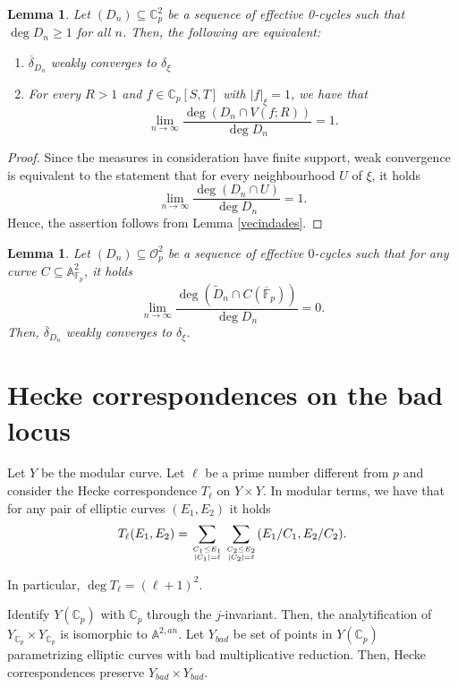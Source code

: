 \documentclass[a4paper,11pt]{amsart}
\newcommand{\Fp}{\mathbb{F}_p}
\newcommand{\Fpbar}{\overline{\mathbb{F}}_p}
\newcommand{\ce}{\mathbb{C}}
\newcommand{\Aan}{\mathbb{A}^{2,an}}
\newcommand{\Oo}{\mathcal{O}}
\newtheorem{lema}[thm]{Lemma}
\theoremstyle{definition}
\begin{document}
\begin{lema}\label{criterion}
Let $(D_n)\subseteq \ce_p^2$ be a sequence of effective 0-cycles such that $\deg D_n\geq 1$ for all $n$. Then, the following are equivalent:
\begin{enumerate}
\item[i)] $\overline{\delta}_{D_n} $ weakly converges to $\delta_\xi$
\item[ii)] For every $R>1$ and $f\in \ce_p[S,T]$ with $|f|_\xi=1$, we have that $$\lim_{n\rightarrow \infty} \frac{\deg \left(D_n\cap V(f;R)\right)}{\deg D_n} =1.$$ 
\end{enumerate}
\end{lema}

\begin{proof}
Since the measures in consideration have finite support, weak convergence is equivalent to the statement that for every neighbourhood $U$ of $\xi$, it holds $$\lim_{n\rightarrow \infty} \frac{\deg (D_n\cap U)}{\deg D_n} =1.$$ Hence, the assertion follows from Lemma \ref{vecindades}.
\end{proof}

\begin{lema}\label{criterionmodp}
Let $(D_n)\subseteq \Oo_p^2$ be a sequence of effective $0$-cycles such that for any curve $C\subseteq \mathbb{A}^2_{\Fp}$, it holds $$\lim_{n\rightarrow \infty} \frac{\deg\left(\tilde{D}_n\cap C(\Fpbar)\right)}{\deg D_n} =0.$$ Then, $\overline{\delta}_{D_n}$ weakly converges to $\delta_\xi$.
\end{lema}

\section{Hecke correspondences on the bad locus}
Let $Y$ be the modular curve. Let $\ell$ be a prime number different from $p$ and consider the Hecke correspondence $T_\ell$ on $Y\times Y$. In modular terms, we have that for any pair of elliptic curves $(E_1,E_2)$ it holds $$T_\ell(E_1,E_2)=\sum_{C_1\leq E_1 \atop |C_1|=\ell } \sum_{C_2\leq E_2 \atop |C_2|=\ell } (E_1/C_1,E_2/C_2).$$

In particular, $\deg T_\ell = (\ell+1)^2$. 

Identify $Y(\ce_p)$ with $\ce_p$ through the $j$-invariant. Then, the analytification of $Y_{\ce_p}\times Y_{\ce_p}$ is isomorphic to $\Aan$. Let $Y_{bad}$ be set of points in $Y(\ce_p)$ parametrizing elliptic curves with bad multiplicative reduction. Then,  Hecke correspondences preserve $Y_{bad}\times Y_{bad}$. 
\end{document}

